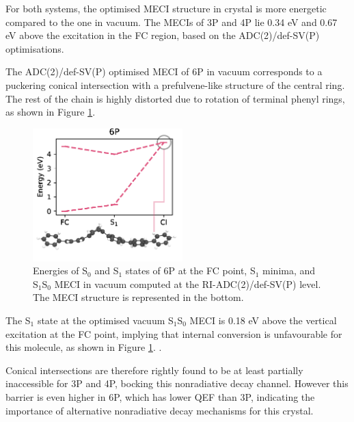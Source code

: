 For both systems, the optimised MECI structure in crystal is more energetic compared to the one in vacuum. The MECIs of 3P and 4P lie 0.34 eV and 0.67 eV above the excitation in the FC region, based on the ADC(2)/def-SV(P) optimisations.

The ADC(2)/def-SV(P) optimised MECI of 6P in vacuum corresponds to a puckering conical intersection with a prefulvene-like structure of the central ring. The rest of the chain is highly distorted due to rotation of terminal phenyl rings, as shown in Figure \ref{fig:6P_conical}.

\begin{figure}[h!]
\centering
\includegraphics[width=5.8cm]{Chapters/7Applications/6P_conical.pdf}
\caption{Energies of S$_0$ and S$_1$ states of 6P at the FC point, S$_1$ minima, and S$_1$\textendash{}S$_0$ MECI in vacuum computed at the RI-ADC(2)/def-SV(P) level. The MECI structure is represented in the bottom.}
\label{fig:6P_conical}
\end{figure}

The S$_1$ state at the optimised vacuum S$_1$\textendash{}S$_0$ MECI is 0.18 eV above the vertical excitation at the FC point, implying that internal conversion is unfavourable for this molecule, as shown in Figure \ref{fig:6P_conical}. . 

Conical intersections are therefore rightly found to be at least partially inaccessible for 3P and 4P, bocking this nonradiative decay channel. However this barrier is even higher in 6P, which has lower QEF than 3P, indicating the importance of alternative nonradiative decay mechanisms for this crystal.


